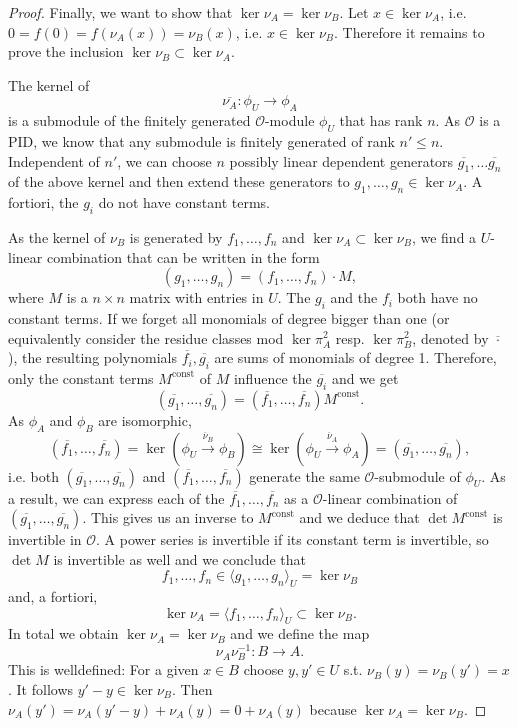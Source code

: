 \documentclass{article}
\theoremstyle{plain}%
\theoremstyle{definition}
\theoremstyle{remark}
\begin{document}
\begin{proof}
    Finally, we want to show that \(\ker \nu_A = \ker \nu_B\).
    Let \(x \in \ker \nu_A\), i.e. \(0 = f(0) = f(\nu_A(x)) = \nu_B(x)\), i.e. \(x \in \ker \nu_B\).
    Therefore it remains to prove the inclusion \(\ker \nu_B \subset \ker \nu_A\).
    
    The kernel of
    \[
        \overline{\nu_A} \colon \phi_U \to \phi_A  
    \]
    is a submodule of the finitely generated \(\mathcal{O}\)-module \(\phi_U\) that has rank \(n\).
    As \(\mathcal{O}\) is a PID, we know that any submodule is finitely generated of rank \(n' \leq n\).
    Independent of \(n'\), we can choose \(n\) possibly linear dependent generators 
    \(\overline{g_1}, \dots \overline{g_n}\) of the above kernel and then extend these generators to 
    \(g_1, \dots, g_n \in \ker \nu_A\). A fortiori, the \(g_i\) do not have constant terms.

    As the kernel of \(\nu_B\) is generated by \(f_1, \dots, f_n\) and \(\ker \nu_A \subset \ker \nu_B\),
    we find a \(U\)-linear combination that can be written in the form
    \[
        (g_1, \dots, g_n) = (f_1, \dots, f_n) \cdot M,
    \]
    where \(M\) is a \(n \times n\) matrix with entries in \(U\).
    The \(g_i\) and the \(f_i\) both have no constant terms. If we forget all monomials 
    of degree bigger than one (or equivalently consider the residue classes mod \(\ker \pi_A^2\) 
    resp. \(\ker \pi_B^2\), denoted by \(\overline{\cdot}\)), the resulting polynomials
    \(\overline{f_i}, \overline{g_i}\) are sums of monomials of degree 1.
    Therefore, only the constant terms \(M^\mathrm{const}\) of \(M\) influence the \(\overline{g_i}\) and we get
    \[
        (\overline{g_1}, \dots, \overline{g_n}) = (\overline{f_1}, \dots, \overline{f_n})M^\mathrm{const}.
    \]
    As \(\phi_A\) and \(\phi_B\) are isomorphic,
    \[ 
        (\overline{f_1}, \dots, \overline{f_n}) = \ker(\phi_U \xrightarrow{\overline{\nu}_B} \phi_B)
        \cong \ker(\phi_U \xrightarrow{\overline{\nu}_A} \phi_A) = (\overline{g_1}, \dots, \overline{g_n}),
    \]
    i.e. both \((\overline{g_1}, \dots, \overline{g_n})\) and \((\overline{f_1}, \dots, \overline{f_n})\) 
    generate the same \(\mathcal{O}\)-submodule of \(\phi_U\).
    As a result, we can express each of the \(\overline{f_1}, \dots, \overline{f_n}\) as a 
    \(\mathcal{O}\)-linear combination of \((\overline{g_1}, \dots, \overline{g_n})\).
    This gives us an inverse to \(M^\mathrm{const}\) and we deduce that \(\det M^\mathrm{const}\) is invertible
    in \(\mathcal{O}\).
    A power series is invertible if its constant term is invertible, so \(\det M\) is invertible
    as well and we conclude that 
    \[ 
        f_1, \dots, f_n \in \langle g_1, \dots, g_n\rangle_U = \ker \nu_B
    \]
    and, a fortiori, 
    \[
        \ker \nu_A = \langle f_1, \dots, f_n\rangle_U \subset \ker \nu_B.
    \]
    In total we obtain \(\ker \nu_A = \ker \nu_B\) and we define the map 
    \[
        \nu_A\nu_B^{-1}\colon B \to A.  
    \]
    This is welldefined: For a given \(x \in B\) choose \(y, y' \in U\) s.t. 
    \(\nu_B(y) = \nu_B(y') = x\). It follows \(y' - y \in \ker \nu_B\). 
    Then \(\nu_A(y') = \nu_A(y'-y) + \nu_A(y) = 0 + \nu_A(y)\) because \(\ker \nu_A = \ker \nu_B\).
    

\end{proof}
\end{document}
